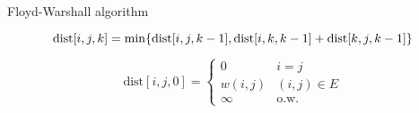 
\begin{frame}{}
  \centerline{}
\end{frame}

\begin{frame}{}
  \centerline{\large Floyd-Warshall algorithm}

  \[
    \text{dist}[i,j,k] = \min \{\text{dist}[i,j,k-1], \text{dist}[i,k,k-1] + \text{dist}[k,j,k-1]\}
  \]


  \[
    \text{dist}[i,j,0] = \left\{\begin{array}{ll}
      0 & i = j \\
      w(i,j) & (i,j) \in E \\
      \infty & \text{o.w.}
    \end{array} \right.
  \]
\end{frame}
